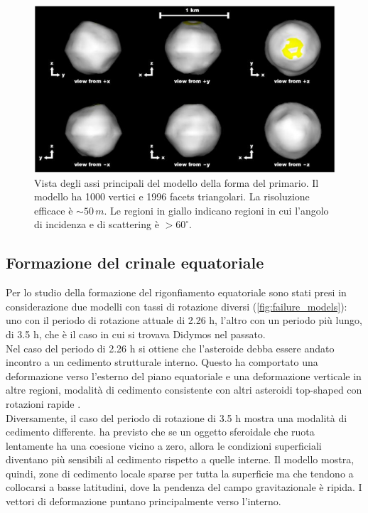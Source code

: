\documentclass[a4paper,11pt,openright]{book}
\begin{document}
\begin{figure}
    \centering
    \includegraphics[scale=0.78]{figure/didymos_shape_model.jpg}
    \caption[Vista degli assi principali del modello della forma del primario.]{Vista degli assi principali del modello della forma del primario. Il modello ha 1000 vertici e 1996 facets triangolari. La risoluzione efficace è $\sim 50\,m$. Le regioni in giallo indicano regioni in cui l'angolo di incidenza e di scattering è $>60^\circ$. \citep{naidu_radar_2020}}
    \label{fig:didymos_shape_model}
\end{figure}

\subsection{Formazione del crinale equatoriale}\label{sec:eq_ridge}

Per lo studio della formazione del rigonfiamento equatoriale sono stati presi in considerazione due modelli con tassi di rotazione diversi (\cref{fig:failure_models}): uno con il periodo di rotazione attuale di 2.26 h, l'altro con un periodo più lungo, di 3.5 h, che è il caso in cui si trovava Didymos nel passato.\\
Nel caso del periodo di 2.26 h si ottiene che l'asteroide debba essere andato incontro a un cedimento strutturale interno. Questo ha comportato una deformazione verso l'esterno del piano equatoriale e una deformazione verticale in altre regioni, modalità di cedimento consistente con altri asteroidi top-shaped con rotazioni rapide \citep{hirabayashi_rotationally_2019}.\\
Diversamente, il caso del periodo di rotazione di 3.5 h mostra una modalità di cedimento differente. \citet{hirabayashi_failure_2015} ha previsto che se un oggetto sferoidale che ruota lentamente ha una coesione vicino a zero, allora le condizioni superficiali diventano più sensibili al cedimento rispetto a quelle interne. Il modello mostra, quindi, zone di cedimento locale sparse per tutta la superficie ma che tendono a collocarsi a basse latitudini, dove la pendenza del campo gravitazionale è ripida. I vettori di deformazione puntano principalmente verso l'interno.
\end{document}
